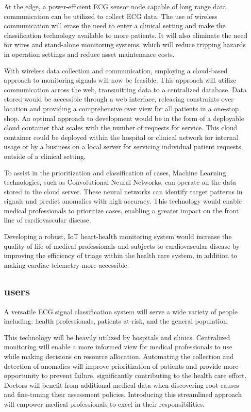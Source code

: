 \documentclass{article}
\begin{document}
At the edge, a power-efficient ECG sensor node capable of long range data communication can be utilized to collect ECG data. The use of wireless communication will erase the need to enter a clinical setting and make the classification technology available to more patients. It will also eliminate the need for wires and stand-alone monitoring systems, which will reduce tripping hazards in operation settings and reduce asset maintenance costs. 

With wireless data collection and communication, employing a cloud-based approach to monitoring signals will now be feasible. This approach will utilize communication across the web, transmitting data to a centralized database. Data stored would be accessible through a web interface, releasing constraints over location  and providing a comprehensive over view for all patients in a one-stop shop. An optimal approach to development would be in the form of a deployable cloud container that scales with the number of requests for service. This cloud container could be deployed within the hospital or clinical network for internal usage or by a business on a local server for servicing individual patient requests, outside of a clinical setting.

To assist in the prioritization and classification of cases, Machine Learning technologies, such as Convolutional Neural Networks, can operate on the data stored in the cloud server. These neural networks can identify target patterns in signals and predict anomalies with high accuracy. This technology would enable medical professionals to prioritize cases, enabling a greater impact on the front line of cardiovascular disease.

Developing a robust, IoT heart-health monitoring system would increase the quality of life of medical professionals and subjects to cardiovascular disease by improving the efficiency of triage within the health care system, in addition 
to making cardiac telemetry more accessible. 

\newpage
\subsection{\gls{users}}
A versatile ECG signal classification system will serve a wide variety of people including: health professionals, patients at-risk, and the general population.

This technology will be heavily utilized by hospitals and clinics. Centralized monitoring will enable a more informed view for medical professionals to use while making decisions on resource allocation. Automating the collection and detection of anomalies will improve prioritization of patients and provide more opportunity to prevent failure, significantly contributing to the health care effort. Doctors will benefit from additional medical data when discovering root causes and fine-tuning their assessment policies. Introducing this streamlined approach will empower medical professionals to excel in their responsibilities.
\end{document}
